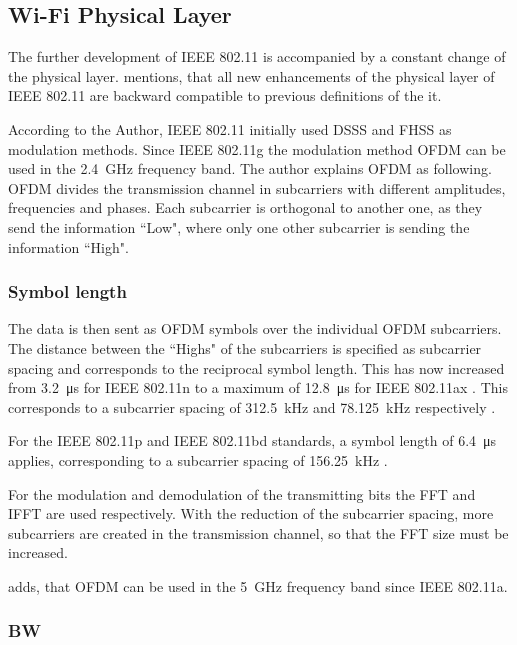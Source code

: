 \subsection*{Wi-Fi Physical Layer}
The further development of IEEE 802.11 is accompanied by a constant change of the physical layer. \textcite{sauter_wireless_2022} mentions, that all new enhancements of the physical layer of IEEE 802.11 are backward compatible to previous definitions of the it.

According to the Author, IEEE 802.11 initially used DSSS and FHSS as modulation methods.
Since IEEE 802.11g the modulation method \ac{OFDM} can be used in the \SI{2.4}{\giga\hertz} frequency band.
The author explains \ac{OFDM} as following. \ac{OFDM} divides the transmission channel in subcarriers with different
amplitudes, frequencies and phases. Each subcarrier is orthogonal to another one, as they send the information ``Low",
where only one other subcarrier is sending the information ``High".

\subsubsection*{Symbol length}
The data is then sent as \ac{OFDM} symbols over the individual \ac{OFDM} subcarriers.
The distance between the ``Highs" of the subcarriers is specified as subcarrier spacing and corresponds to the reciprocal
symbol length. This has now increased from \SI{3.2}{\micro\second} for IEEE 802.11n  to a maximum of \SI{12.8}{\micro\second} for IEEE 802.11ax \cite{sauter_wireless_2022}.
This corresponds to a subcarrier spacing of \SI{312.5}{\kilo\hertz} and \SI{78.125}{\kilo\hertz} respectively \cite{sauter_wireless_2022}.

For the IEEE 802.11p and IEEE 802.11bd standards, a symbol length of \SI{6.4}{\micro\second} applies, corresponding to a subcarrier spacing of \SI{156.25}{\kilo\hertz} \cite{jacob_system-level_2020}.

For the modulation and demodulation of the transmitting bits the FFT and IFFT are used respectively. With the reduction of the subcarrier spacing, more subcarriers are created in the transmission channel, so that the FFT size must be increased. 

\textcite{kauffels_wireless_2002} adds, that \ac{OFDM} can be used in the \SI{5}{\giga\hertz} frequency band since IEEE 802.11a. 
\subsubsection*{\acf{BW}}
